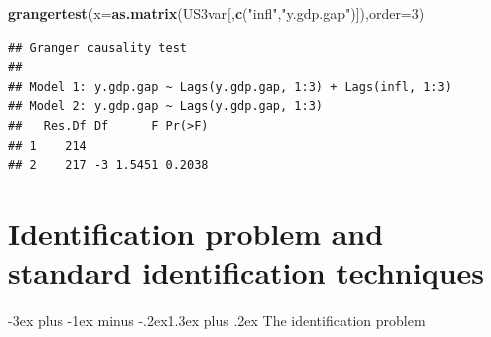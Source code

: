 \documentclass[
  11pt,
]{book}
\makeatletter
\newenvironment{Shaded}{\begin{snugshade}}{\end{snugshade}}
\newcommand{\AttributeTok}[1]{\textcolor[rgb]{0.13,0.29,0.53}{#1}}
\newcommand{\DecValTok}[1]{\textcolor[rgb]{0.00,0.00,0.81}{#1}}
\newcommand{\FunctionTok}[1]{\textcolor[rgb]{0.13,0.29,0.53}{\textbf{#1}}}
\newcommand{\NormalTok}[1]{#1}
\newcommand{\StringTok}[1]{\textcolor[rgb]{0.31,0.60,0.02}{#1}}
\renewcommand\section{\@startsection{section}{1}{\z@}
  {-3ex plus -1ex minus -.2ex}{1.3ex plus .2ex}
  {\normalfont\Large\bfseries\color{TextbookInk}}}
\theoremstyle{definition}
\theoremstyle{definition}
\theoremstyle{definition}
\theoremstyle{definition}
\theoremstyle{remark}
\makeatother
\begin{document}
\begin{Shaded}
\begin{Highlighting}[]
\FunctionTok{grangertest}\NormalTok{(}\AttributeTok{x=}\FunctionTok{as.matrix}\NormalTok{(US3var[,}\FunctionTok{c}\NormalTok{(}\StringTok{"infl"}\NormalTok{,}\StringTok{"y.gdp.gap"}\NormalTok{)]),}\AttributeTok{order=}\DecValTok{3}\NormalTok{)}
\end{Highlighting}
\end{Shaded}

\begin{verbatim}
## Granger causality test
## 
## Model 1: y.gdp.gap ~ Lags(y.gdp.gap, 1:3) + Lags(infl, 1:3)
## Model 2: y.gdp.gap ~ Lags(y.gdp.gap, 1:3)
##   Res.Df Df      F Pr(>F)
## 1    214                 
## 2    217 -3 1.5451 0.2038
\end{verbatim}

\chapter{Identification problem and standard identification techniques}\label{identifStruct}

\section{The identification problem}\label{IdentifPbm}
\end{document}
